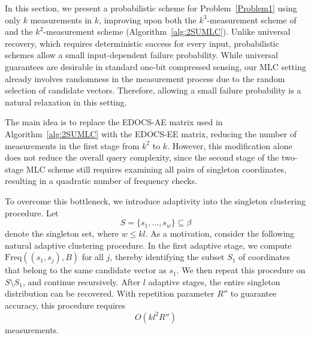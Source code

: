 \documentclass{article}
\newcommand{\xl}[1]{{\color{blue}#1}}
\begin{document}
In this section, we present a probabilistic scheme for Problem~\ref{Problem1} using only $k$ measurements in $k$, improving upon both the $k^3$-measurement scheme of~\cite{gandikota2020recovery} and the $k^2$-measurement scheme (Algorithm~\ref{alg:2SUMLC}). Unlike universal recovery, which requires deterministic success for every input, probabilistic schemes allow a small input-dependent failure probability. While universal guarantees are desirable in standard one-bit compressed sensing, our MLC setting already involves randomness in the measurement process due to the random selection of candidate vectors. Therefore, allowing a small failure probability is a natural relaxation in this setting.

The main idea is to replace the EDOCS-AE matrix used in Algorithm~\ref{alg:2SUMLC} with the EDOCS-EE matrix, reducing the number of measurements in the first stage from $k^2$ to $k$. However, this modification alone does not reduce the overall query complexity, since the second stage of the two-stage MLC scheme still requires examining all pairs of singleton coordinates, resulting in a quadratic number of frequency checks.


To overcome this bottleneck, we introduce adaptivity into the singleton clustering procedure. Let
\[
S=\{s_1,\ldots,s_w\}\subseteq\beta
\]
denote the singleton set, where $w\le kl$. As a motivation, consider the following natural adaptive clustering procedure. In the first adaptive stage, we compute $\mathrm{Freq}((s_1,s_j),B)$ for all $j$, thereby identifying the subset $S_1$ of coordinates that belong to the same candidate vector as $s_1$. We then repeat this procedure on $S\setminus S_1$, and continue recursively. After $l$ adaptive stages, the entire singleton distribution can be recovered. With repetition parameter $R''$ to guarantee accuracy, this procedure requires
\[
O(kl^2R'')
\]
measurements.
\end{document}
